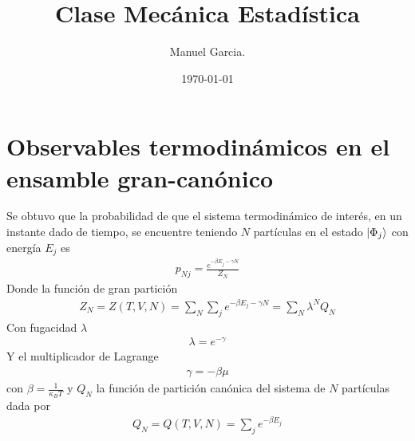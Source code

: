 \documentclass{article}
\title{Clase Mecánica Estadística }
\author{Manuel Garcia.}
\date{\today}
\begin{document}
\maketitle

\section{Observables termodinámicos en el ensamble gran-canónico}
Se obtuvo que la probabilidad de que el sistema termodinámico de interés, en un instante dado de tiempo, se encuentre teniendo $ N  $ partículas en el estado $ \ket{\Phi_j } $ con energía $ E_j  $ es 
\begin{gather*}
  p _{Nj } = \frac{e ^ {-\beta E_j - \gamma N }}{Z_N } 
\end{gather*}
Donde la función de gran partición 
\begin{gather*}
  Z_N = Z(T,V,N) = \displaystyle\sum_{N }^{}\displaystyle\sum_{j }^{} e ^ {-\beta E_j - \gamma N } = \displaystyle\sum_{N }^{} \lambda^N Q_N  
\end{gather*}
Con fugacidad $ \lambda  $
\begin{gather*}
  \lambda = e ^ {-\gamma } 
\end{gather*}
Y el multiplicador de Lagrange 
\begin{gather*}
  \gamma = - \beta\mu 
\end{gather*}
con $ \beta = \frac{1}{\kappa_B T } $ y $ Q_N  $ la función de partición canónica del sistema de $ N  $ partículas dada por 
\begin{gather*}
  Q_N = Q(T,V,N) = \displaystyle\sum_{j }^{} e ^ {- \beta E_j } 
\end{gather*}

\hfill 

\hfill 
\end{document}
